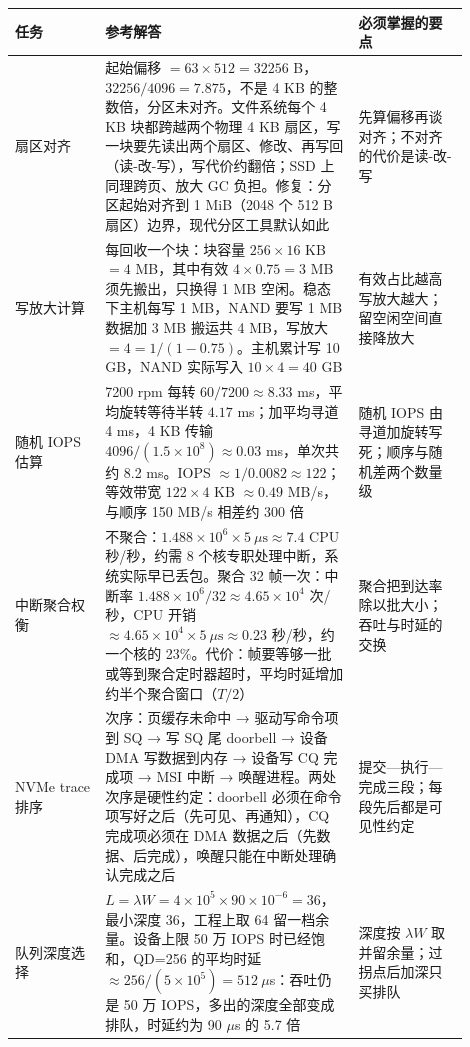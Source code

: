 \begin{longtable}{L{0.18\linewidth}L{0.5\linewidth}L{0.22\linewidth}}
\toprule
任务 & 参考解答 & 必须掌握的要点 \\
\midrule
扇区对齐 & 起始偏移 $=63\times512=32256$ B，$32256/4096=7.875$，不是 4 KB 的整数倍，分区未对齐。文件系统每个 4 KB 块都跨越两个物理 4 KB 扇区，写一块要先读出两个扇区、修改、再写回（读-改-写），写代价约翻倍；SSD 上同理跨页、放大 GC 负担。修复：分区起始对齐到 1 MiB（2048 个 512 B 扇区）边界，现代分区工具默认如此 & 先算偏移再谈对齐；不对齐的代价是读-改-写 \\
写放大计算 & 每回收一个块：块容量 $256\times16$ KB $=4$ MB，其中有效 $4\times0.75=3$ MB 须先搬出，只换得 1 MB 空闲。稳态下主机每写 1 MB，NAND 要写 1 MB 数据加 3 MB 搬运共 4 MB，写放大 $=4=1/(1-0.75)$。主机累计写 10 GB，NAND 实际写入 $10\times4=40$ GB & 有效占比越高写放大越大；留空闲空间直接降放大 \\
随机 IOPS 估算 & 7200 rpm 每转 $60/7200\approx8.33$ ms，平均旋转等待半转 $4.17$ ms；加平均寻道 4 ms，4 KB 传输 $4096/(1.5\times10^{8})\approx0.03$ ms，单次共约 8.2 ms。IOPS $\approx1/0.0082\approx122$；等效带宽 $122\times4$ KB $\approx0.49$ MB/s，与顺序 150 MB/s 相差约 300 倍 & 随机 IOPS 由寻道加旋转写死；顺序与随机差两个数量级 \\
中断聚合权衡 & 不聚合：$1.488\times10^{6}\times5\ \mu\text{s}\approx7.4$ CPU 秒/秒，约需 8 个核专职处理中断，系统实际早已丢包。聚合 32 帧一次：中断率 $1.488\times10^{6}/32\approx4.65\times10^{4}$ 次/秒，CPU 开销 $\approx4.65\times10^{4}\times5\ \mu\text{s}\approx0.23$ 秒/秒，约一个核的 23\%。代价：帧要等够一批或等到聚合定时器超时，平均时延增加约半个聚合窗口（$T/2$） & 聚合把到达率除以批大小；吞吐与时延的交换 \\
NVMe trace 排序 & 次序：页缓存未命中 → 驱动写命令项到 SQ → 写 SQ 尾 doorbell → 设备 DMA 写数据到内存 → 设备写 CQ 完成项 → MSI 中断 → 唤醒进程。两处次序是硬性约定：doorbell 必须在命令项写好之后（先可见、再通知），CQ 完成项必须在 DMA 数据之后（先数据、后完成），唤醒只能在中断处理确认完成之后 & 提交—执行—完成三段；每段先后都是可见性约定 \\
队列深度选择 & $L=\lambda W=4\times10^{5}\times90\times10^{-6}=36$，最小深度 36，工程上取 64 留一档余量。设备上限 50 万 IOPS 时已经饱和，QD=256 的平均时延 $\approx256/(5\times10^{5})=512\ \mu$s：吞吐仍是 50 万 IOPS，多出的深度全部变成排队，时延约为 90 $\mu$s 的 5.7 倍 & 深度按 $\lambda W$ 取并留余量；过拐点后加深只买排队 \\
\bottomrule
\end{longtable}
